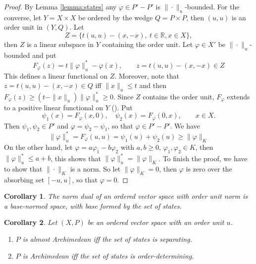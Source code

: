\documentclass[12pt]{article}
\newtheorem{coro}{Corollary}
\theoremstyle{remark}
\newcommand{\<}{\langle}
\begin{document}
\begin{proof}\cite{ellis} By Lemma \ref{lemma:states}  any $\varphi\in P'-P'$ is $\|\cdot\|_u$-bounded. 
For the converse, let $Y=X\times X$ be ordered by the wedge $Q=P\times P$, then $(u,u)$ is an order unit in $(Y,Q)$.
Let 
\[
Z=\{t(u,u)-(x,-x),\ t\in \mathbb R, x\in X\},
\]
then $Z$ is a linear subspace in $Y$ containing the order unit. 
Let  $\varphi\in X'$ be $\|\cdot\|_u$-bounded and  put 
\[
F_\varphi(z)=t\|\varphi\|_u^*-\varphi(x), \qquad z=t(u,u)-(x,-x)\in Z
\]
This defines a linear functional on $Z$. Moreover, note that $z=t(u,u)-(x,-x)\in Q$ iff $\|x\|_u\le t$ and then $F_\varphi(z)\ge (t-\|x\|_u)\|\varphi\|_u^*\ge 0$.
Since $Z$ contains the order unit, $F_\varphi$ extends to a positive linear functional on $Y$ (\cite[Corollary 1.6.2]{jameson}). Put 
\[
\psi_1(x)=F_\varphi(x,0),\quad \psi_2(x)=F_\varphi(0,x),\qquad x\in X.
\]
Then $\psi_1,\psi_2\in P'$ and $\varphi=\psi_2-\psi_1$, so that $\varphi\in P'-P'$. We have 
\[
\|\varphi\|_u^*=F_\varphi(u,u)= \psi_1(u)+\psi_2(u)\ge \|\varphi\|_K
\]
On the other hand, let $\varphi=a\varphi_1- b\varphi_2$ with $a,b\ge 0$, $\varphi_1,\varphi_2\in K$, then
$\|\varphi\|^*_u\le a+b$, this shows that $\|\varphi\|_u^*=\|\varphi\|_K$. To finish the proof, we have to show that $\|\cdot\|_K$ is a norm. So let $\|\varphi\|_K=0$, then $\varphi$ is zero over the absorbing set $[-u,u]$, so that $\varphi=0$.



\end{proof}

\begin{coro} The norm dual of an ordered vector space with order unit norm is a base-normed space, with base formed by the set of states.

\end{coro}

\begin{coro} Let $(X,P)$ be an ordered vector space with an order unit $u$. 
\begin{enumerate}
\item[(i)] $P$ is almost Archimedean iff the set of states is separating.
\item[(ii)] $P$ is  Archimedean iff the set of states is order-determining.
\end{enumerate}


\end{coro}
\end{document}
